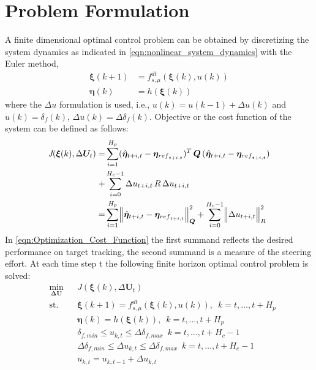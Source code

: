 \documentclass[12pt]{article}
\DeclarePairedDelimiter{\norm}{\lVert}{\rVert}
\begin{document}
\section{Problem Formulation}
A finite dimensional optimal control problem can be obtained by discretizing the system dynamics as indicated in \ref{eqn:nonlinear_system_dynamics} with the Euler method,
\begin{subequations} 
	\label{eqn:discretize_system}
	\begin{align} 
	{\bm{\xi}}(k+1) &= f^{dt}_{s,\mu}(\bm{\xi}(k),u(k)) \\
	\bm{\eta}(k) &= h(\bm{\xi}(k))
	\end{align} 
\end{subequations}
where the $\Delta u$ formulation is used, i.e., $u(k) = u(k-1)+\Delta u(k)$ and $u(k)=\delta_{f}(k)$, $\Delta u(k)=\Delta\delta_{f}(k)$. Objective or the cost function of the system can be defined as follows:
\begin{align}
\label{eqn:Optimization_Cost_Function}  
\bm{\textit{J}}(\bm{\xi}(k),\Delta\bm{U}_{t})  =& \sum\limits_{i=1}^{H_{p}}(\hat{\bm{\eta}}_{t+i,t}-{\bm{\eta}}_{{ref}_{t+i,t}})^{T}\,\bm{\bm{Q}}\,(\hat{\bm{\eta}}_{t+i,t}-{\bm{\eta}}_{{ref}_{t+i,t}})  \nonumber\\ +&\sum\limits_{i=0}^{H_{c}-1}\Delta{u}_{t+i,t}\,{R}\,\Delta{u}_{t+i,t}\, \\
=& \sum\limits_{i=1}^{H_{p}} \norm[\Big]{\hat{\bm{\eta}}_{t+i,t}-{\bm{\eta}}_{{ref}_{t+i,t}}}^{2}_{\bm{Q}} + \sum\limits_{i=0}^{H_{c}-1}  \norm[\Big]{\Delta{u}_{t+i,t}}^{2}_{R} \nonumber
\end{align} 
In \ref{eqn:Optimization_Cost_Function} the first summand reflects the desired performance on target tracking, the second summand is a measure of the steering effort. At each time step t the following finite horizon optimal control problem is solved:
\begin{equation} 
	\label{eqn:mpc_problem_formulation}
	\begin{aligned}
	& \underset{\bm{\Delta{U}}}{\text{min}}
	& & \bm{\textit{J}}(\bm{\xi}(k),\Delta\bm{U}_{t})  \\
	& \text{st.}
	& & {\bm{\xi}}(k+1) = f^{dt}_{s,\mu}(\bm{\xi}(k),u(k)),\,\,\, k = t,\dots,t+H_{p} \\
	& 
	& & \bm{\eta}(k) = h(\bm{\xi}(k)),\,\,\, k = t,\dots,t+H_{p} \\
	& 
	& & \delta_{f,min} \leq u_{k,t} \leq \Delta\delta_{f,max} \,\,\, k = t,\dots,t+H_{c}-1 \\
	& 
	& & \Delta\delta_{f,min} \leq \Delta u_{k,t} \leq \Delta\delta_{f,max} \,\,\, k = t,\dots,t+H_{c}-1 \\
	& 
	& & u_{k,t} = u_{k,t-1} + \Delta u_{k,t}
	\end{aligned} 
\end{equation}
\end{document}
